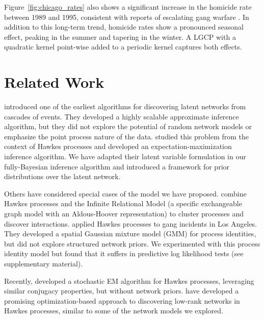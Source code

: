 Figure~\ref{fig:chicago_rates} also shows a significant increase in
the homicide rate between 1989 and 1995, consistent with reports of
escalating gang warfare \cite{Block-1993}. In addition to this
long-term trend, homicide rates show a pronounced seasonal effect,
peaking in the summer and tapering in the winter. A LGCP with a
quadratic kernel point-wise added to a periodic kernel captures both
effects.

\section{Related Work}
\citet{Gomez-2010} introduced one of the earliest algorithms for
discovering latent networks from cascades of events. They developed a
highly scalable approximate inference algorithm, but they did not
explore the potential of random network models or emphasize the point
process nature of the data.
\citet{Simma-2010} studied this problem from the context of Hawkes
processes and developed an expectation-maximization inference
algorithm.
We have adapted their latent variable formulation in our
fully-Bayesian inference algorithm and introduced a framework for
prior distributions over the latent network.

Others have considered special cases of the model we have
proposed. \citet{Blundell-2012} combine Hawkes processes and the
Infinite Relational Model (a specific exchangeable graph model with an
Aldous-Hoover representation) to cluster processes and discover
interactions. \citet{Cho-2013} applied Hawkes processes to gang
incidents in Los Angeles. They developed a spatial Gaussian mixture
model (GMM) for process identities, but did not explore structured
network priors. We experimented with this process identity model but
found that it suffers in predictive log likelihood tests (see
supplementary material).

Recently, \citet{Iwata-2013} developed a stochastic EM algorithm for
Hawkes processes, leveraging similar conjugacy properties, but without
network priors. \citet{Zhou-2013} have developed a promising
optimization-based approach to discovering low-rank networks in Hawkes
processes, similar to some of the network models we explored.

